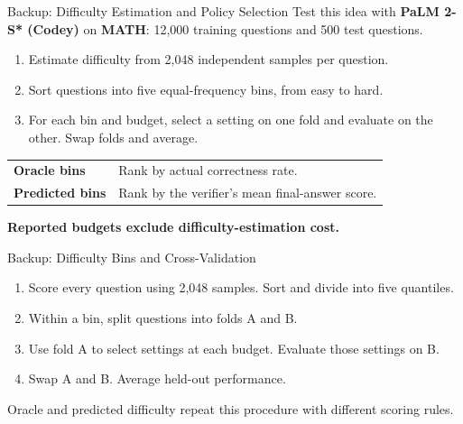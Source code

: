 \documentclass[aspectratio=1610,xcolor=dvipsnames,t]{beamer}
\newcommand{\keyterm}[1]{\textcolor{unirot}{\textbf{#1}}}
\newcommand{\papersource}[1]{}
\begin{document}
\begin{frame}{Backup: Difficulty Estimation and Policy Selection}
  Test this idea with \textbf{PaLM 2-S* (Codey)} on \textbf{MATH}: 12,000 training questions and 500 test questions.
  \par\medskip
  \begin{enumerate}
    \item Estimate difficulty from 2,048 independent samples per question.
    \item Sort questions into five equal-frequency bins, from easy to hard.
    \item For each bin and budget, select a setting on one fold and evaluate on the other. Swap folds and average.
  \end{enumerate}
  \par\smallskip
  \begin{tabular}{@{}ll@{}}
    \textbf{Oracle bins} & Rank by actual correctness rate.\\
    \textbf{Predicted bins} & Rank by the verifier's mean final-answer score.
  \end{tabular}
  \par\medskip
  \keyterm{Reported budgets exclude difficulty-estimation cost.}
\end{frame}


\begin{frame}{Backup: Difficulty Bins and Cross-Validation}
  \begin{enumerate}
    \item Score every question using 2,048 samples. Sort and divide into five quantiles.
    \item Within a bin, split questions into folds A and B.
    \item Use fold A to select settings at each budget. Evaluate those settings on B.
    \item Swap A and B. Average held-out performance.
  \end{enumerate}
  \par\medskip
  Oracle and predicted difficulty repeat this procedure with different scoring rules.
  \papersource{Section 3.2.}
\end{frame}
\end{document}
